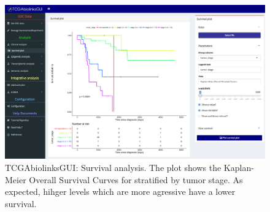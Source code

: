 \begin{figure}[h!]

\includegraphics[width=1.0\linewidth]{images/gui_acc_survival.png}

  \caption[TCGAbiolinksGUI: Survival analysis]{TCGAbiolinksGUI: Survival analysis.
  The plot shows the Kaplan-Meier Overall Survival Curves for  stratified by tumor stage.
  As expected, hihger levels which are more agressive have a lower survival.}
  \label{fig:gui_survival}
\end{figure}





